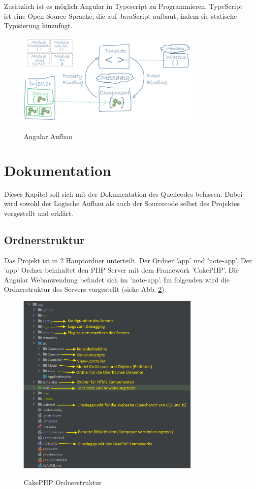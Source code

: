\documentclass[12pt]{article}
\begin{document}
Zusätzlich ist es möglich Angular in Typescript zu Programmieren. TypeScript ist eine Open-Source-Sprache, die auf JavaScript aufbaut, indem sie statische Typisierung hinzufügt.
\begin{figure}[h!]
    \caption{Angular Aufbau}
    \centering
    \includegraphics[width=0.8\textwidth]{architecture-angular.png}
    \label{fig:architecture-angular}
\end{figure}

    \section{Dokumentation}

Dieses Kapitel soll sich mit der Dokumentation des Quellcodes befassen. Dabei wird sowohl der Logische Aufbau als auch der Sourcecode selbst des Projektes vorgestellt und erklärt. 

        \subsection{Ordnerstruktur}

Das Projekt ist in 2 Hauptordner unterteilt. Der Ordner 'app' und 'note-app'. Der 'app' Ordner beinhaltet den PHP Server mit dem Framework 'CakePHP'. Die Angular Webanwendung befindet sich im 'note-app'. Im folgenden wird die Ordnerstruktur des Servers vorgestellt (siehe Abb. \ref{fig:path-php}).
\begin{figure}[h!]
    \caption{CakePHP Ordnerstruktur}
    \centering
    \includegraphics[width=0.8\textwidth]{cakephp-paths.png}
    \label{fig:path-php}
\end{figure}
\end{document}
